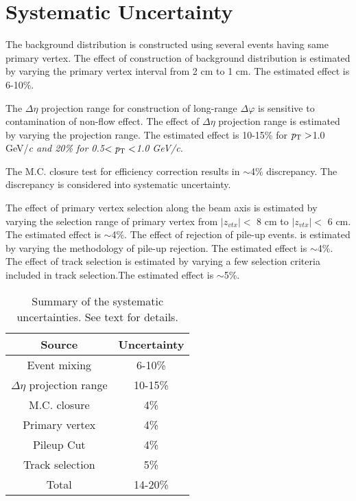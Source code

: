 \section{Systematic Uncertainty}
\label{sec:uncertainties}
The background distribution is constructed using several events having same primary vertex. The effect of construction of background distribution is estimated by varying the primary vertex interval from 2 cm to 1 cm. The estimated effect is 6-10\%.

The $\Delta\eta$ projection range for construction of long-range $\Delta\varphi$ is sensitive to contamination of non-flow effect. The effect of  $\Delta\eta$ projection range is estimated by varying the projection range. The estimated effect is 10-15\% for $\it{p}_{\rm{T}}>$1.0 GeV/\it{c}\rm{} and 20\% for 0.5$<\it{p}_{\rm{T}}<$1.0 GeV/\it{c}\rm{}. 

The M.C. closure test for efficiency correction results in $\sim$4\% discrepancy. The discrepancy is considered into systematic uncertainty.

The effect of primary vertex selection along the beam axis is estimated by varying the selection range of primary vertex from $|z_{vtx}|<$ 8 cm to $|z_{vtx}|<$ 6 cm. The estimated effect is $\sim$4\%. The effect of rejection of pile-up events. is estimated by varying the methodology of pile-up rejection. The estimated effect is $\sim$4\%. The effect of track selection is estimated by varying a few selection criteria included in track selection.The estimated effect is $\sim$5\%. 


\begin{table}[!h]
\centering
\caption{ Summary of the systematic uncertainties. See text for details.}
\begin{tabular}{ c|c }
\hline
Source &  Uncertainty \\ \hline
Event mixing & 6-10\% \\  \hline
$\Delta\eta$ projection range & 10-15\% \\ \hline
M.C. closure & 4\% \\ \hline
Primary vertex & 4\% \\ \hline
Pileup Cut & 4\% \\ \hline
Track selection & 5\% \\ \hline
Total & 14-20\% \\
\hline
\end{tabular}
\end{table}




